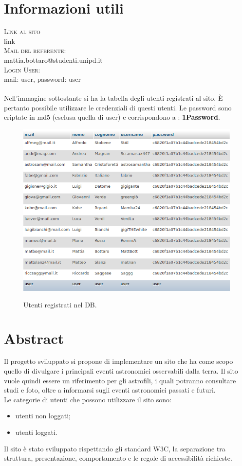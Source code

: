 	\section{Informazioni utili}
	\textsc{\Large Link al sito\\ }link\\[0.5cm]
	\textsc{\Large Mail del referente:\\ }mattia.bottaro@studenti.unipd.it\\[0.5cm]
	\textsc{\Large Login User:}\\[0.5cm] mail: user, password: user \\ \\
	Nell'immagine sottostante si ha la tabella degli utenti registrati al sito. È pertanto possibile utilizzare le credenziali di questi utenti. Le password sono criptate in md5 (esclusa quella di user) e corrispondono a : \textbf{1Password}.
		\begin{figure}
			\includegraphics[scale=0.7]{images/utenti.png}\\[1cm] \caption{Utenti registrati nel DB.}
		\end{figure}
	\newpage
	\tableofcontents
	\listoffigures
	\newpage
	
	
	\section{Abstract}
	Il progetto sviluppato si propone di implementare un sito che ha come scopo quello di divulgare i principali eventi astronomici osservabili dalla terra.
	Il sito vuole quindi essere un riferimento per gli astrofili, i quali potranno consultare studi e foto, oltre a informarsi sugli eventi astronomici passati e futuri. \\
	Le categorie di utenti che possono utilizzare il sito sono:
	\begin{itemize}
	\item utenti non loggati;
	\item utenti loggati.
	\end{itemize}
	Il sito è stato sviluppato rispettando gli
	standard W3C, la separazione tra struttura, presentazione, comportamento
	e le regole di accessibilità richieste.
	
